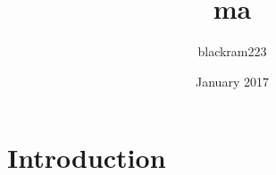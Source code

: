\documentclass{article}
\title{ma}
\author{blackram223 }
\date{January 2017}
\begin{document}
\maketitle

\section{Introduction}
\end{document}
